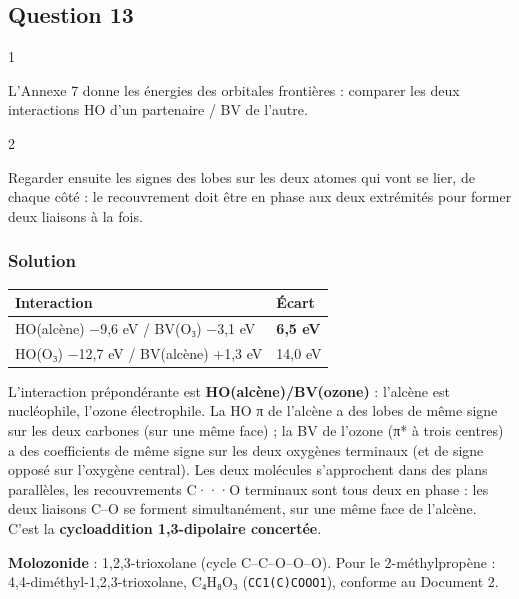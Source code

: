 \documentclass[11pt,a4paper]{article}
\begin{document}
\hypertarget{question-13}{%
\subsection{Question 13}\label{question-13}}

\begin{indication}{1}

L'Annexe 7 donne les énergies des orbitales frontières : comparer les deux interactions HO d'un partenaire / BV de l'autre.

\end{indication}

\begin{indication}{2}

Regarder ensuite les signes des lobes sur les deux atomes qui vont se lier, de chaque côté : le recouvrement doit être en phase aux deux extrémités pour former deux liaisons à la fois.

\end{indication}

\hypertarget{solution-12}{%
\subsubsection{Solution}\label{solution-12}}

\begin{longtable}[]{@{}ll@{}}
\toprule\noalign{}
Interaction & Écart \\
\midrule\noalign{}
\endhead
\bottomrule\noalign{}
\endlastfoot
HO(alcène) −9,6 eV / BV(O₃) −3,1 eV & \textbf{6,5 eV} \\
HO(O₃) −12,7 eV / BV(alcène) +1,3 eV & 14,0 eV \\
\end{longtable}

L'interaction prépondérante est \textbf{HO(alcène)/BV(ozone)} : l'alcène est nucléophile, l'ozone électrophile. La HO π de l'alcène a des lobes de même signe sur les deux carbones (sur une même face) ; la BV de l'ozone (π* à trois centres) a des coefficients de même signe sur les deux oxygènes terminaux (et de signe opposé sur l'oxygène central). Les deux molécules s'approchent dans des plans parallèles, les recouvrements C···O terminaux sont tous deux en phase : les deux liaisons C--O se forment simultanément, sur une même face de l'alcène. C'est la \textbf{cycloaddition 1,3-dipolaire concertée}.

\textbf{Molozonide} : 1,2,3-trioxolane (cycle C--C--O--O--O). Pour le 2-méthylpropène : 4,4-\allowbreak{}diméthyl-\allowbreak{}1,2,3-\allowbreak{}trioxolane, C₄H₈O₃ (\texttt{CC1(C)COOO1}), conforme au Document 2.
\end{document}
